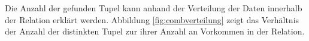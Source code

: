 %

Die Anzahl der gefunden Tupel kann anhand der Verteilung der Daten innerhalb der Relation erklärt werden.
Abbildung \ref{fig:combverteilung} zeigt das Verhältnis der Anzahl der distinkten Tupel zur ihrer Anzahl an Vorkommen in der Relation.



